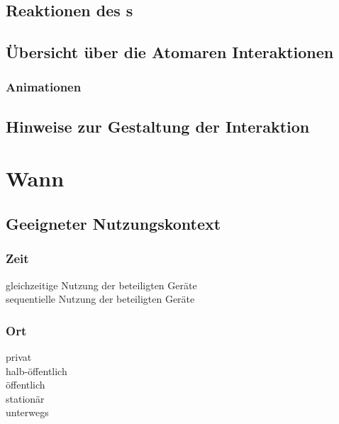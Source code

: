 		\subsection*{Reaktionen des \sendev s}
		\reactionSen
	\fi
\fi	

\ifx\microinteractionstabular\undefined
\else
	\subsection*{Übersicht über die Atomaren Interaktionen}
	\microinteractionstabular
\fi

\ifx\animations\undefined
\else
	\subsubsection*{Animationen}
	\animations
\fi

\subsection*{Hinweise zur Gestaltung der Interaktion}
\designnotes


\section*{Wann}

\subsection*{Geeigneter Nutzungskontext}
\validcontext

\subsubsection*{Zeit}
\checkbox{\simultaneously} gleichzeitige Nutzung der beteiligten Geräte \\
\checkbox{\sequentially} sequentielle Nutzung der beteiligten Geräte

\subsubsection*{Ort}
\checkbox{\private} privat \\
\checkbox{\semipublic} halb-öffentlich \\
\checkbox{\public} öffentlich \\
\checkbox{\stationary} stationär \\
\checkbox{\onthego} unterwegs 

